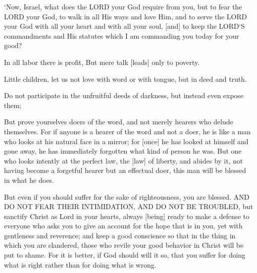 \begin{scripture}[Deuteronomy 10:12-13]
    `Now, Israel, what does the LORD your God require from you, but to fear the LORD your God, to walk in all His ways and love Him, and to serve the LORD your God with all your heart and with all your soul,
    [and] to keep the LORD`S commandments and His statutes which I am commanding you today for your good?
\end{scripture}

\begin{scripture}[Proverbs 14:23]
    In all labor there is profit, But mere talk [leads] only to poverty.
\end{scripture}

\begin{scripture}[1 John 3:18]
    Little children, let us not love with word or with tongue, but in deed and truth.
\end{scripture}

\begin{scripture}[Ephesians 5:11]
    Do not participate in the unfruitful deeds of darkness, but instead even expose them;
\end{scripture}

\begin{scripture}[James 1:22-25]
    But prove yourselves doers of the word, and not merely hearers who delude themselves.
    For if anyone is a hearer of the word and not a doer, he is like a man who looks at his natural face in a mirror;
    for [once] he has looked at himself and gone away, he has immediately forgotten what kind of person he was.
    But one who looks intently at the perfect law, the [law] of liberty, and abides by it, not having become a forgetful hearer but an effectual doer, this man will be blessed in what he does.
\end{scripture}

\begin{scripture}[1 Peter 3:14-17]
    But even if you should suffer for the sake of righteousness, you are blessed. AND DO NOT FEAR THEIR INTIMIDATION, AND DO NOT BE TROUBLED,
    but sanctify Christ as Lord in your hearts, always [being] ready to make a defense to everyone who asks you to give an account for the hope that is in you, yet with gentleness and reverence;
    and keep a good conscience so that in the thing in which you are slandered, those who revile your good behavior in Christ will be put to shame.
    For it is better, if God should will it so, that you suffer for doing what is right rather than for doing what is wrong.
\end{scripture}

